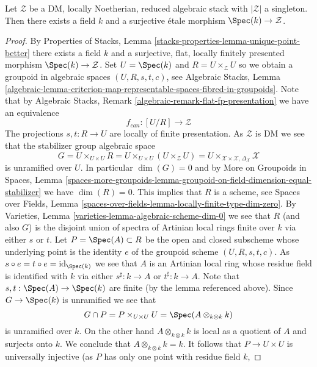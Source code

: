 \begin{lemma}
\label{lemma-DM-residual-gerbe}
Let $\mathcal{Z}$ be a DM, locally Noetherian, reduced algebraic stack
with $|\mathcal{Z}|$ a singleton. Then there exists a field $k$ and
a surjective \'etale morphism $\Spec(k) \to \mathcal{Z}$.
\end{lemma}

\begin{proof}
By
Properties of Stacks, Lemma \ref{stacks-properties-lemma-unique-point-better}
there exists a field $k$ and a surjective, flat, locally finitely presented
morphism $\Spec(k) \to \mathcal{Z}$. Set $U = \Spec(k)$ and
$R = U \times_\mathcal{Z} U$ so we obtain a groupoid in algebraic spaces
$(U, R, s, t, c)$, see
Algebraic Stacks, Lemma
\ref{algebraic-lemma-criterion-map-representable-spaces-fibred-in-groupoids}.
Note that by
Algebraic Stacks, Remark \ref{algebraic-remark-flat-fp-presentation}
we have an equivalence
$$
f_{can} : [U/R] \longrightarrow \mathcal{Z}
$$
The projections $s, t : R \to U$ are locally of finite presentation.
As $\mathcal{Z}$ is DM we see that the stabilizer group algebraic space
$$
G = U \times_{U \times U} R = U \times_{U \times U} (U \times_\mathcal{Z} U) =
U \times_{\mathcal{X} \times \mathcal{X}, \Delta_\mathcal{X}} \mathcal{X}
$$
is unramified over $U$. In particular $\dim(G) = 0$ and by
More on Groupoids in Spaces, Lemma
\ref{spaces-more-groupoids-lemma-groupoid-on-field-dimension-equal-stabilizer}
we have $\dim(R) = 0$. This implies that $R$ is a scheme, see
Spaces over Fields, Lemma
\ref{spaces-over-fields-lemma-locally-finite-type-dim-zero}.
By
Varieties, Lemma \ref{varieties-lemma-algebraic-scheme-dim-0}
we see that $R$ (and also $G$) is the disjoint union of spectra of
Artinian local rings finite over $k$ via either $s$ or $t$. Let
$P = \Spec(A) \subset R$ be the open and
closed subscheme whose underlying point is the identity $e$ of the groupoid
scheme $(U, R, s, t, c)$. As
$s \circ e = t \circ e = \text{id}_{\Spec(k)}$ we see that $A$
is an Artinian local ring whose residue field is identified with $k$
via either $s^\sharp : k \to A$ or $t^\sharp : k \to A$.
Note that $s, t : \Spec(A) \to \Spec(k)$
are finite (by the lemma referenced above). Since
$G \to \Spec(k)$ is unramified we see that
$$
G \cap P = P \times_{U \times U} U = \Spec(A \otimes_{k \otimes k} k)
$$
is unramified over $k$. On the other hand $A \otimes_{k \otimes k} k$
is local as a quotient of $A$ and surjects onto $k$. We conclude that
$A \otimes_{k \otimes k} k = k$. It follows that $P \to U \times U$
is universally injective (as $P$ has only one point with residue field $k$,

\end{proof}
